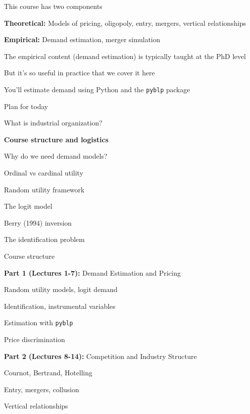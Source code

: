 \documentclass[notes,11pt, aspectratio=169]{beamer}
\newenvironment{wideitemize}{\itemize\addtolength{\itemsep}{10pt}}{\enditemize}
\newenvironment{wideenumerate}{\enumerate\addtolength{\itemsep}{10pt}}{\endenumerate}
\begin{document}
\begin{frame}{This course has two components}
	\begin{wideitemize}
		\item \textbf{Theoretical:} Models of pricing, oligopoly, entry, mergers, vertical relationships
		\item \textbf{Empirical:} Demand estimation, merger simulation
	\end{wideitemize}
	\vspace{11pt}
	\begin{wideitemize}
		\item The empirical content (demand estimation) is typically taught at the PhD level
		\item But it's so useful in practice that we cover it here
		\item You'll estimate demand using Python and the \texttt{pyblp} package
	\end{wideitemize}
\end{frame}

\begin{frame}{Plan for today}
  \begin{wideenumerate}
    \item What is industrial organization?
    \item \textbf{Course structure and logistics}
    \item Why do we need demand models?
    \item Ordinal vs cardinal utility
    \item Random utility framework
    \item The logit model
    \item Berry (1994) inversion
    \item The identification problem
  \end{wideenumerate}
\end{frame}

\begin{frame}{Course structure}
	\begin{wideenumerate}
		\item \textbf{Part 1 (Lectures 1-7):} Demand Estimation and Pricing
		\begin{wideitemize}
			\vspace{5pt}
			\item Random utility models, logit demand
			\item Identification, instrumental variables
			\item Estimation with \texttt{pyblp}
			\item Price discrimination
		\end{wideitemize}
		\item \textbf{Part 2 (Lectures 8-14):} Competition and Industry Structure
		\begin{wideitemize}
			\vspace{5pt}
			\item Cournot, Bertrand, Hotelling
			\item Entry, mergers, collusion
			\item Vertical relationships
		\end{wideitemize}
	\end{wideenumerate}
\end{frame}
\end{document}
